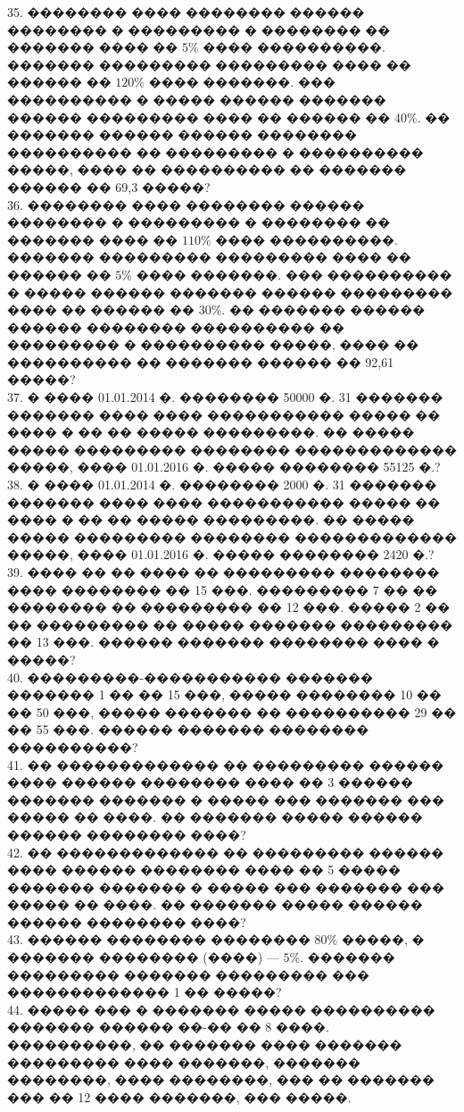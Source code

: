 \documentclass[12pt]{article}
\begin{document}
35. �������� ���� �������� ������ �������� � ��������� � �������� �� ������� ���� �� $5\%$ ���� ����������. ������� ��������� ��������� ���� �� ������ �� $120\%$ ���� �������. ��� ���������� � ����� ������ ������� ������ ��������� ���� �� ������ �� $40\%.$ �� ������� ������ ������ �������� ���������� �� ��������� � ���������� �����, ���� �� ���������� �� ������� ������ �� 69,3 �����?\\
36. �������� ���� �������� ������ �������� � ��������� � �������� �� ������� ���� �� $110\%$ ���� ����������. ������� ��������� ��������� ���� �� ������ �� $5\%$ ���� �������. ��� ���������� � ����� ������ ������� ������ ��������� ���� �� ������ �� $30\%.$ �� ������� ������ ������ �������� ���������� �� ��������� � ���������� �����, ���� �� ���������� �� ������� ������ �� 92,61 �����?\\
37. � ���� 01.01.2014 �. �������� 50000 �. 31 ������� ������� ���� ���� ����������� ����� �� ���� � �� �� ����� ���������. �� ����� ����� ��������� �������� ������������� �����, ���� 01.01.2016 �. ����� �������� 55125 �.?\\
38. � ���� 01.01.2014 �. �������� 2000 �. 31 ������� ������� ���� ���� ����������� ����� �� ���� � �� �� ����� ���������. �� ����� ����� ��������� �������� ������������� �����, ���� 01.01.2016 �. ����� �������� 2420 �.?\\
39. ���� �� �� ���� �� ��������� �������� ���� �������� �� 15 ���. ��������� 7 �� �� �������� �� ��������� �� 12 ���. ����� 2 �� �� ��������� �� ����� ������� ��������� �� 13 ���. ������ ������� �������� ���� � �����?\\
40. ���������-����������� ������� ������� 1 �� �� 15 ���, ����� �������� 10 �� �� 50 ���, ����� ������� �� ���������� 29 �� �� 55 ���. ������ ������� �������� ����������?\\
41. �� ������������� �� ��������� ������ ���� ������ �������� ���� �� 3 ������ ������� ������� � ����� ��� ������� ��� ����� �� ����. �� ������� ����� ������ ������ �������� ����?\\
42. �� ������������� �� ��������� ������ ���� ������ �������� ���� �� 5 ����� ������� ������� � ����� ��� ������� ��� ����� �� ����. �� ������� ����� ������ ������ �������� ����?\\
43. ������ �������� �������� $80\%$ �����, � ������� �������� (����) --- $5\%.$ ������� ��������� ������� ��������� ��� ������������� 1 �� �����?\\
44. ����� ��� � ������� ����� ���������� ������� ������ ��-�� �� 8 ����. ����������, �� ������� ���� ������� ��������� ���� �������, ������� ��������, ���� ��������, ��� �� ������� ��� �� 12 ���� �������, ��� �����.\\
\end{document}
